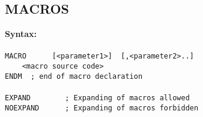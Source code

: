         \subsection{MACROS}
        \textbf{Syntax:}\\
        {
            ~\\
            \usecodefont
            \verb'MACRO      [<parameter1>]  [,<parameter2>..]'\\
            \verb'    <macro source code>'\\
            \verb'ENDM  ; end of macro declaration '
        }\\

        {
            ~\\
            \usecodefont
            \verb'EXPAND        ; Expanding of macros allowed'\\
            \verb'NOEXPAND      ; Expanding of macros forbidden '\\
        }\\

